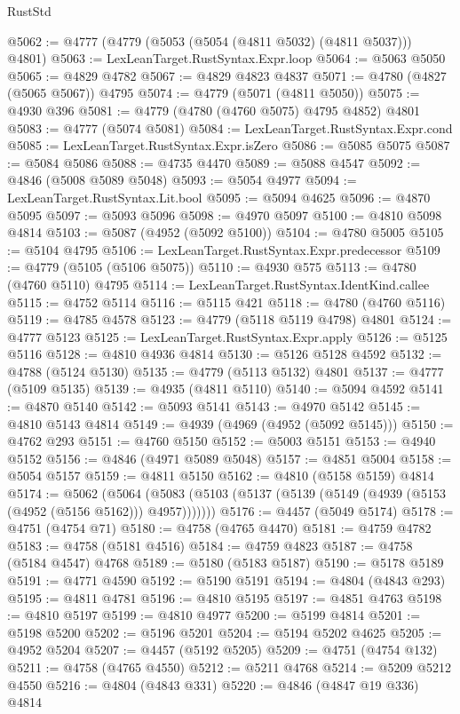 \begin{lexlean}{RustStd}
\begin{coremodule}
@5062 := @4777 (@4779 (@5053 (@5054 (@4811 @5032) (@4811 @5037))) @4801)
@5063 := LexLeanTarget.RustSyntax.Expr.loop
@5064 := @5063 @5050
@5065 := @4829 @4782
@5067 := @4829 @4823 @4837
@5071 := @4780 (@4827 (@5065 @5067)) @4795
@5074 := @4779 (@5071 (@4811 @5050))
@5075 := @4930 @396
@5081 := @4779 (@4780 (@4760 @5075) @4795 @4852) @4801
@5083 := @4777 (@5074 @5081)
@5084 := LexLeanTarget.RustSyntax.Expr.cond
@5085 := LexLeanTarget.RustSyntax.Expr.isZero
@5086 := @5085 @5075
@5087 := @5084 @5086
@5088 := @4735 @4470
@5089 := @5088 @4547
@5092 := @4846 (@5008 @5089 @5048)
@5093 := @5054 @4977
@5094 := LexLeanTarget.RustSyntax.Lit.bool
@5095 := @5094 @4625
@5096 := @4870 @5095
@5097 := @5093 @5096
@5098 := @4970 @5097
@5100 := @4810 @5098 @4814
@5103 := @5087 (@4952 (@5092 @5100))
@5104 := @4780 @5005
@5105 := @5104 @4795
@5106 := LexLeanTarget.RustSyntax.Expr.predecessor
@5109 := @4779 (@5105 (@5106 @5075))
@5110 := @4930 @575
@5113 := @4780 (@4760 @5110) @4795
@5114 := LexLeanTarget.RustSyntax.IdentKind.callee
@5115 := @4752 @5114
@5116 := @5115 @421
@5118 := @4780 (@4760 @5116)
@5119 := @4785 @4578
@5123 := @4779 (@5118 @5119 @4798) @4801
@5124 := @4777 @5123
@5125 := LexLeanTarget.RustSyntax.Expr.apply
@5126 := @5125 @5116
@5128 := @4810 @4936 @4814
@5130 := @5126 @5128 @4592
@5132 := @4788 (@5124 @5130)
@5135 := @4779 (@5113 @5132) @4801
@5137 := @4777 (@5109 @5135)
@5139 := @4935 (@4811 @5110)
@5140 := @5094 @4592
@5141 := @4870 @5140
@5142 := @5093 @5141
@5143 := @4970 @5142
@5145 := @4810 @5143 @4814
@5149 := @4939 (@4969 (@4952 (@5092 @5145)))
@5150 := @4762 @293
@5151 := @4760 @5150
@5152 := @5003 @5151
@5153 := @4940 @5152
@5156 := @4846 (@4971 @5089 @5048)
@5157 := @4851 @5004
@5158 := @5054 @5157
@5159 := @4811 @5150
@5162 := @4810 (@5158 @5159) @4814
@5174 := @5062
    (@5064 (@5083 (@5103 (@5137 (@5139 (@5149 (@4939 (@5153 (@4952 (@5156 @5162))) @4957)))))))
@5176 := @4457 (@5049 @5174)
@5178 := @4751 (@4754 @71)
@5180 := @4758 (@4765 @4470)
@5181 := @4759 @4782
@5183 := @4758 (@5181 @4516)
@5184 := @4759 @4823
@5187 := @4758 (@5184 @4547) @4768
@5189 := @5180 (@5183 @5187)
@5190 := @5178 @5189
@5191 := @4771 @4590
@5192 := @5190 @5191
@5194 := @4804 (@4843 @293)
@5195 := @4811 @4781
@5196 := @4810 @5195
@5197 := @4851 @4763
@5198 := @4810 @5197
@5199 := @4810 @4977
@5200 := @5199 @4814
@5201 := @5198 @5200
@5202 := @5196 @5201
@5204 := @5194 @5202 @4625
@5205 := @4952 @5204
@5207 := @4457 (@5192 @5205)
@5209 := @4751 (@4754 @132)
@5211 := @4758 (@4765 @4550)
@5212 := @5211 @4768
@5214 := @5209 @5212 @4550
@5216 := @4804 (@4843 @331)
@5220 := @4846 (@4847 @19 @336) @4814

\end{coremodule}
\end{lexlean}
